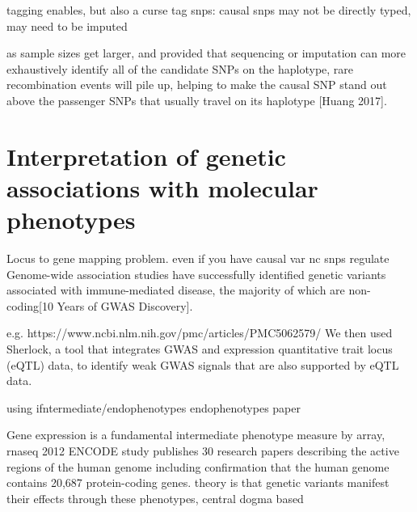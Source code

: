 \begin{outline}
    \2 tagging enables, but also a curse
    \2 tag snps: causal snps may not be directly typed, may need to be imputed

    \2 as sample sizes get larger, and provided that sequencing or imputation can more exhaustively identify all of the candidate SNPs on the haplotype, rare recombination events will pile up, helping to make the causal SNP stand out above the passenger SNPs that usually travel on its haplotype [Huang 2017].

\section{Interpretation of genetic associations with molecular phenotypes}

\1 Locus to gene mapping problem. even if you have causal var
    \2 nc snps regulate
        \3 Genome-wide association studies have successfully identified genetic variants associated with immune-mediated disease, the majority of which are non-coding[10 Years of GWAS Discovery].

        e.g.
            https://www.ncbi.nlm.nih.gov/pmc/articles/PMC5062579/
            We then used Sherlock, a tool that integrates GWAS and expression quantitative trait locus (eQTL) data, to identify weak GWAS signals that are also supported by eQTL data. 


\1 using ifntermediate/endophenotypes
    \2 endophenotypes paper

\1 Gene expression is a fundamental intermediate phenotype
        \2 measure by array, rnaseq 
 2012
ENCODE study publishes 30 research papers describing the active regions of the human genome including confirmation that the human genome contains 20,687 protein-coding genes.
    \2 theory is that genetic variants manifest their effects through these phenotypes, central dogma based


\end{outline}
